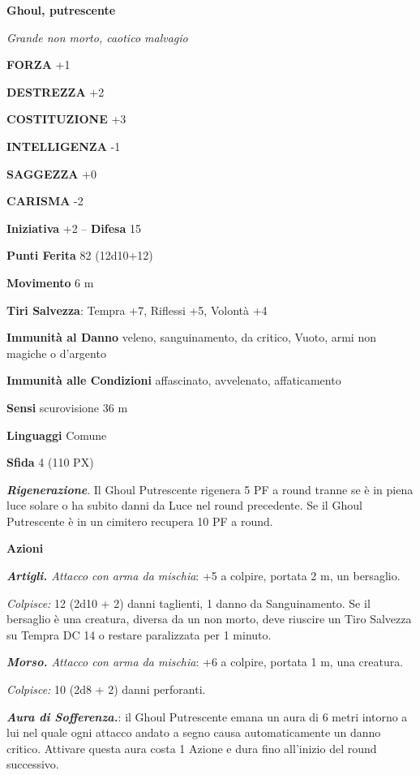 \begin{multicols}{2}
\medskip{}\textbf{Ghoul, putrescente}

\textit{Grande non morto, caotico malvagio}

\textbf{FORZA} +1

\textbf{DESTREZZA} +2

\textbf{COSTITUZIONE} +3

\textbf{INTELLIGENZA} -1

\textbf{SAGGEZZA} +0

\textbf{CARISMA} -2

\textbf{Iniziativa} +2 -- \textbf{Difesa} 15

\textbf{Punti Ferita} 82 (12d10+12)

\textbf{Movimento} 6 m

\textbf{Tiri Salvezza}: Tempra +7, Riflessi +5, Volontà +4

\textbf{Immunità al Danno} veleno, sanguinamento, da critico, Vuoto, armi non magiche o d'argento

\textbf{Immunità alle Condizioni} affascinato, avvelenato, affaticamento

\textbf{Sensi} scurovisione 36 m

\textbf{Linguaggi} Comune

\textbf{Sfida} 4 (110 PX)

\textbf{\textit{Rigenerazione}}. Il Ghoul Putrescente rigenera 5 PF a round tranne se è in piena luce solare o ha subito danni da Luce nel round precedente. Se il Ghoul Putrescente è in un cimitero recupera 10 PF a round.

\textbf{Azioni}

\textit{\textbf{Artigli.} Attacco con arma da mischia}: +5 a colpire, portata 2 m, un bersaglio.

\textit{Colpisce:} 12 (2d10 + 2) danni taglienti, 1 danno da Sanguinamento. Se il bersaglio è una creatura, diversa da un non morto, deve riuscire un Tiro Salvezza su Tempra DC 14 o restare paralizzata per 1 minuto.

\textit{\textbf{Morso.} Attacco con arma da mischia}: +6 a colpire, portata 1 m, una creatura.

\textit{Colpisce:} 10 (2d8 + 2) danni perforanti.

\textit{\textbf{Aura di Sofferenza.}}: il Ghoul Putrescente emana un aura di 6 metri intorno a lui nel quale ogni attacco andato a segno causa automaticamente un danno critico. Attivare questa aura costa 1 Azione e dura fino all'inizio del round successivo.


\end{multicols}

